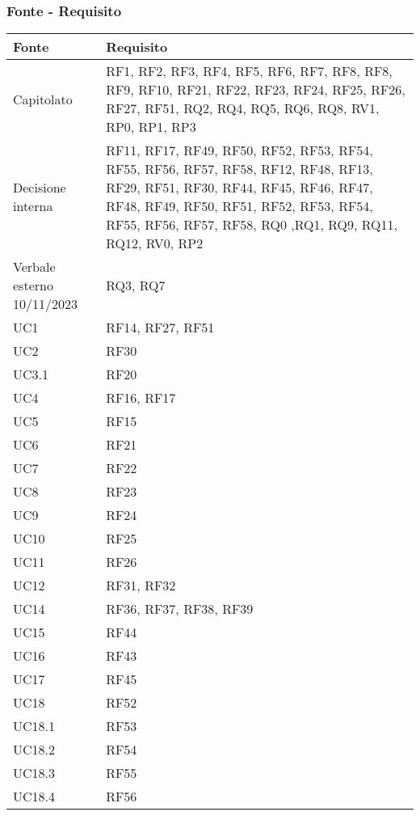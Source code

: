   \subsubsection{Fonte - Requisito}

\begin{center}
  \begin{longtable}{|C{5cm}|C{5cm}|}
    \hline
    \textbf{Fonte} & \textbf{Requisito} \\
    \hline
    Capitolato & RF1, RF2, RF3, RF4, RF5, RF6, RF7, RF8, RF8, RF9, RF10, RF21, RF22, RF23, RF24, RF25, RF26, RF27, RF51, RQ2, RQ4, RQ5, RQ6, RQ8, RV1, RP0, RP1, RP3  \\
    \hline
    Decisione interna & RF11, RF17, RF49, RF50, RF52, RF53, RF54, RF55, RF56, RF57, RF58, RF12, RF48, RF13, RF29, RF51, RF30, RF44, RF45, RF46, RF47, RF48, RF49, RF50, RF51, RF52, RF53, RF54, RF55, RF56, RF57, RF58, RQ0 ,RQ1, RQ9, RQ11, RQ12, RV0, RP2 \\
    \hline
    Verbale esterno 10/11/2023 & RQ3, RQ7 \\
    \hline
    UC1 & RF14, RF27, RF51 \\
    \hline
    UC2 & RF30 \\
    \hline
    UC3.1 & RF20 \\
    \hline
    UC4 & RF16, RF17 \\
    \hline
    UC5 & RF15 \\
    \hline
    UC6 & RF21 \\
    \hline
    UC7 & RF22 \\
    \hline
    UC8 & RF23 \\
    \hline
    UC9 & RF24 \\
    \hline
    UC10 & RF25 \\
    \hline
    UC11 & RF26 \\
    \hline
    UC12 & RF31, RF32 \\
    \hline
    UC14 & RF36, RF37, RF38, RF39 \\
    \hline
    UC15 & RF44 \\
    \hline
    UC16 & RF43 \\
    \hline
    UC17 & RF45 \\
    \hline
    UC18 & RF52 \\
    \hline
    UC18.1 & RF53 \\
    \hline
    UC18.2 & RF54 \\
    \hline
    UC18.3 & RF55 \\
    \hline
    UC18.4 & RF56 \\
    \hline

\end{longtable}
\end{center}
